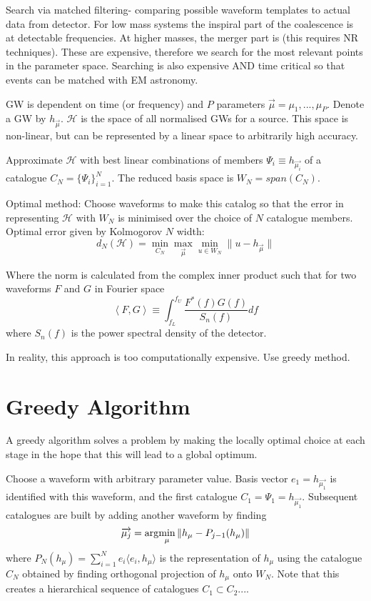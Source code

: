 Search via matched filtering- comparing possible waveform templates to actual data from detector. For low mass systems the inspiral part of the coalescence is at detectable frequencies. At higher masses, the merger part is (this requires NR techniques). These are expensive, therefore we search for the most relevant points in the parameter space. Searching is also expensive AND time critical so that events can be matched with EM astronomy.

GW is dependent on time (or frequency) and $P$ parameters $\overrightarrow{\mu}={\mu_1, ...,\mu_P}$. Denote a GW by $h_{\overrightarrow{\mu}}$. $\mathcal{H}$ is the space of all normalised GWs for a source. This space is non-linear, but can be represented by a linear space to arbitrarily high accuracy.

Approximate $\mathcal{H}$ with best linear combinations of members $\Psi_i \equiv h_{\overrightarrow{\mu_i}}$ of a catalogue $C_N=\{\Psi_i\}^N_{i=1}$. The reduced basis space is $W_N=span(C_N)$. 

Optimal method: Choose waveforms to make this catalog so that the error in representing $\mathcal{H}$ with $W_N$ is minimised over the choice of $N$ catalogue members. Optimal error given by Kolmogorov $N$ width:
\[ d_N(\mathcal{H})= \min_{C_N} \max_{\overrightarrow{\mu}} \min_{u \in W_N } \| u-h_{\overrightarrow{\mu}} \| \]


Where the norm is calculated from the complex inner product such that for two waveforms $F$ and $G$ in Fourier space
\[ \left\langle F,G \right\rangle \equiv \int^{f_U}_{f_L}\frac{F^*(f)G(f)}{S_n(f)}df \]
where $S_n(f)$ is the power spectral density of the detector.

In reality, this approach is too computationally expensive. Use greedy method.

\section{Greedy Algorithm}
A greedy algorithm solves a problem by making the locally optimal choice at each stage in the hope that this will lead to a global optimum.

Choose a waveform with arbitrary parameter value. Basis vector $e_1 =h_{\overrightarrow{\mu_1}}$ is identified with this waveform, and the first catalogue $C_1={\Psi_1=h_{\overrightarrow{\mu_1}}}$. Subsequent catalogues are built by adding another waveform by finding
\begin{equation}
\overrightarrow{\mu_j}=\arg\!\min_{\mu} \| h_{\mu}-P_{j-1}(h_{\mu})\|
\end{equation}
where $P_N(h_{\mu})= \sum_{i=1}^N e_i \langle e_i, h_{\mu} \rangle$ is the representation of $h_{\mu}$ using the catalogue $C_N$ obtained by finding orthogonal projection of $h_{\mu}$ onto $W_N$. Note that this creates a hierarchical sequence of catalogues $C_1 \subset C_2 ...$.

